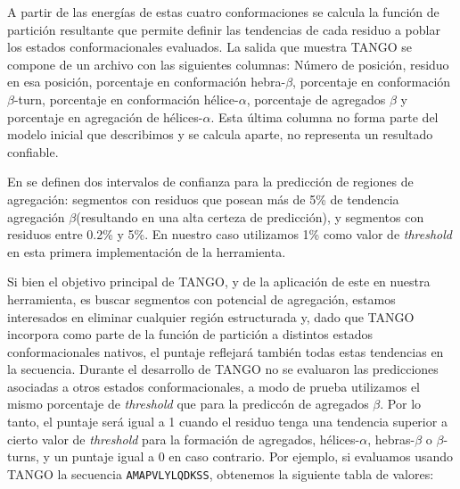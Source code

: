 A partir de las energías de estas cuatro conformaciones se calcula la función de partición resultante que permite definir las tendencias de cada residuo a poblar los estados conformacionales evaluados.
La salida que muestra TANGO se compone de un archivo con las siguientes columnas:
Número de posición, residuo en esa posición, porcentaje en conformación hebra-$\beta$, porcentaje en conformación $\beta$-turn, porcentaje en conformación hélice-$\alpha$, porcentaje de agregados $\beta$ y
porcentaje en agregación de hélices-$\alpha$.
Esta última columna no forma parte del modelo inicial que describimos y se calcula aparte, no representa un resultado confiable.

En \cite{fernandez2004prediction} se definen dos intervalos de confianza para la predicción de regiones de agregación: segmentos con residuos que posean más de 5\% de tendencia agregación $\beta$(resultando en una alta certeza de predicción),
y segmentos con residuos entre 0.2\% y 5\%. En nuestro caso utilizamos 1\% como valor de \textit{threshold} en esta primera implementación de la herramienta.

Si bien el objetivo principal de TANGO, y de la aplicación de este en nuestra herramienta, es buscar segmentos con potencial de agregación, estamos interesados en eliminar cualquier región estructurada y, dado que TANGO incorpora como parte
de la función de partición a distintos estados conformacionales nativos, el puntaje reflejará también todas estas tendencias en la secuencia. Durante el desarrollo de TANGO no se evaluaron las predicciones asociadas a 
otros estados conformacionales, a modo de prueba utilizamos el mismo porcentaje de \textit{threshold} que para la prediccón de agregados $\beta$. 
Por lo tanto, el puntaje será igual a 1 cuando el residuo tenga una tendencia superior a cierto valor de \textit{threshold} para la formación de agregados, hélices-$\alpha$, hebras-$\beta$ o $\beta$-turns, 
y un puntaje igual a 0 en caso contrario.
Por ejemplo, si evaluamos usando TANGO la secuencia \texttt{AMAPVLYLQDKSS}, obtenemos la siguiente tabla de valores:

